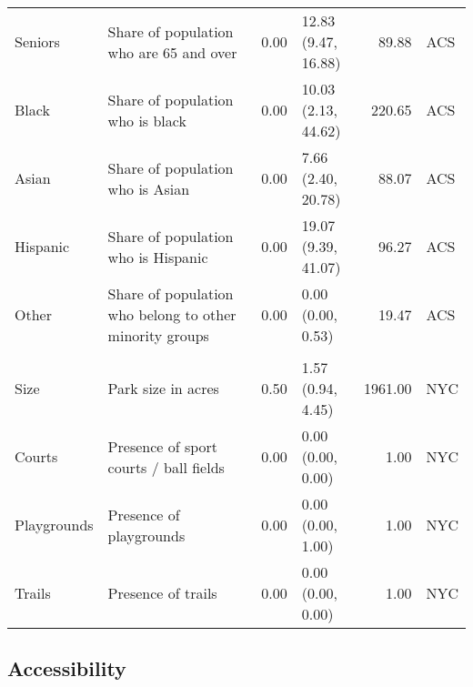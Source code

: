 \documentclass[Crown,sageh.bst]{sagej}
\begin{document}
\begin{table*}
{\begin{tabular}[t]{l>{\raggedright\arraybackslash}p{2in}rlrl}
\hspace{1em}Seniors & Share of population who are 65 and over & 0.00 & \makecell{12.83\\ (9.47, 16.88)} & 89.88 & ACS\\
\hspace{1em}Black & Share of population who is black & 0.00 & \makecell{10.03\\ (2.13, 44.62)} & 220.65 & ACS\\
\hspace{1em}Asian & Share of population who is Asian & 0.00 & \makecell{7.66\\ (2.40, 20.78)} & 88.07 & ACS\\
\hspace{1em}Hispanic & Share of population who is Hispanic & 0.00 & \makecell{19.07\\ (9.39, 41.07)} & 96.27 & ACS\\
\hspace{1em}Other & Share of population who belong to other minority groups & 0.00 & \makecell{0.00\\ (0.00, 0.53)} & 19.47 & ACS\\
\addlinespace[0.3em]
\multicolumn{6}{l}{\textbf{Park Variables, N = 1191}}\\
\hspace{1em}Size & Park size in acres & 0.50 & \makecell{1.57\\ (0.94, 4.45)} & 1961.00 & NYC\\
\hspace{1em}Courts & Presence of sport courts / ball fields & 0.00 & \makecell{0.00\\ (0.00, 0.00)} & 1.00 & NYC\\
\hspace{1em}Playgrounds & Presence of playgrounds & 0.00 & \makecell{0.00\\ (0.00, 1.00)} & 1.00 & NYC\\
\hspace{1em}Trails & Presence of trails & 0.00 & \makecell{0.00\\ (0.00, 0.00)} & 1.00 & NYC\\
\bottomrule
\end{tabular}}
\end{table*}

\hypertarget{accessibility}{%
\subsection{Accessibility}\label{accessibility}}
\end{document}
